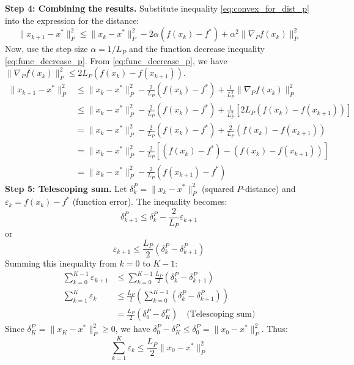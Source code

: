 \documentclass{article}
\newcommand{\normp}[1]{\|#1\|_P}       %
\newcommand{\gradp}{\nabla_P}
\begin{document}
\textbf{Step 4: Combining the results.}
Substitute inequality \eqref{eq:convex_for_dist_p} into the expression for the distance:
\begin{equation*}
    \normp{x_{k+1} - x^*}^2 \le \normp{x_k - x^*}^2 - 2 \alpha (f(x_k) - f^*) + \alpha^2 \normp{\gradp f(x_k)}^2
\end{equation*}
Now, use the step size $\alpha = 1/L_P$ and the function decrease inequality \eqref{eq:func_decrease_p}. From \eqref{eq:func_decrease_p}, we have $\normp{\gradp f(x_k)}^2 \le 2 L_P (f(x_k) - f(x_{k+1}))$.
\begin{align*}
    \normp{x_{k+1} - x^*}^2 &\le \normp{x_k - x^*}^2 - \frac{2}{L_P} (f(x_k) - f^*) + \frac{1}{L_P^2} \normp{\gradp f(x_k)}^2 \\
    &\le \normp{x_k - x^*}^2 - \frac{2}{L_P} (f(x_k) - f^*) + \frac{1}{L_P^2} [2 L_P (f(x_k) - f(x_{k+1}))] \\
    &= \normp{x_k - x^*}^2 - \frac{2}{L_P} (f(x_k) - f^*) + \frac{2}{L_P} (f(x_k) - f(x_{k+1})) \\
    &= \normp{x_k - x^*}^2 - \frac{2}{L_P} \left[ (f(x_k) - f^*) - (f(x_k) - f(x_{k+1})) \right] \\
    &= \normp{x_k - x^*}^2 - \frac{2}{L_P} (f(x_{k+1}) - f^*)
\end{align*}
\textbf{Step 5: Telescoping sum.}
Let $\delta_k^P = \normp{x_k - x^*}^2$ (squared $P$-distance) and $\varepsilon_k = f(x_k) - f^*$ (function error). The inequality becomes:
\begin{equation*}
    \delta_{k+1}^P \le \delta_k^P - \frac{2}{L_P} \varepsilon_{k+1}
\end{equation*}
or
\begin{equation*}
    \varepsilon_{k+1} \le \frac{L_P}{2} (\delta_k^P - \delta_{k+1}^P)
\end{equation*}
Summing this inequality from $k = 0$ to $K-1$:
\begin{align*}
    \sum_{k=0}^{K-1} \varepsilon_{k+1} &\le \sum_{k=0}^{K-1} \frac{L_P}{2} (\delta_k^P - \delta_{k+1}^P) \\
    \sum_{k=1}^{K} \varepsilon_k &\le \frac{L_P}{2} \left( \sum_{k=0}^{K-1} (\delta_k^P - \delta_{k+1}^P) \right) \\
    &= \frac{L_P}{2} (\delta_0^P - \delta_K^P) \quad \text{(Telescoping sum)}
\end{align*}
Since $\delta_K^P = \normp{x_K - x^*}^2 \ge 0$, we have $\delta_0^P - \delta_K^P \le \delta_0^P = \normp{x_0 - x^*}^2$. Thus:
\begin{equation} \label{eq:sum_epsilon_p}
    \sum_{k=1}^{K} \varepsilon_k \le \frac{L_P}{2} \normp{x_0 - x^*}^2
\end{equation}
\end{document}

